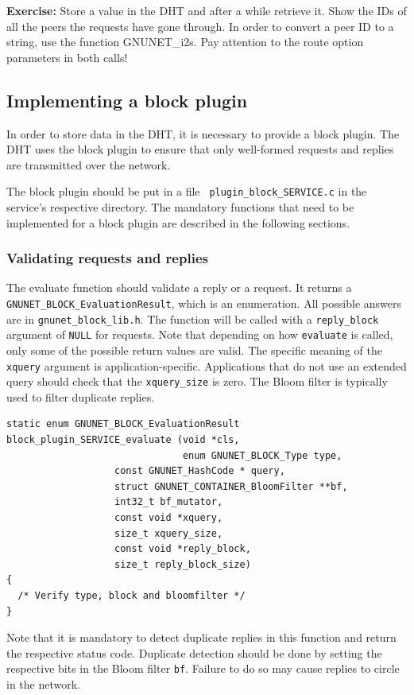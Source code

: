 \documentclass[10pt]{article}
\newcommand{\exercise}[1]{\noindent\begin{boxedminipage}{\textwidth}{\bf Exercise:} #1 \end{boxedminipage}}
\begin{document}
\exercise{Store a value in the DHT and after a while retrieve it. Show the IDs of all 
the peers the requests have gone through. In order to convert a peer ID to a string, use
the function GNUNET\_i2s. Pay attention to the route option parameters in both calls!}

\subsection{Implementing a block plugin}

In order to store data in the DHT, it is necessary to provide a block
plugin.  The DHT uses the block plugin to ensure that only well-formed
requests and replies are transmitted over the network.

The block plugin should be put in a file {\tt
  plugin\_block\_SERVICE.c} in the service's respective directory. The
mandatory functions that need to be implemented for a block plugin are
described in the following sections.

\subsubsection{Validating requests and replies}

The evaluate function should validate a reply or a request. It returns
a {\tt GNUNET\_BLOCK\_EvaluationResult}, which is an enumeration. All
possible answers are in {\tt gnunet\_block\_lib.h}.  The function will
be called with a {\tt reply\_block} argument of {\tt NULL} for
requests.  Note that depending on how {\tt evaluate} is called, only
some of the possible return values are valid.  The specific meaning of
the {\tt xquery} argument is application-specific.  Applications that
do not use an extended query should check that the {\tt xquery\_size}
is zero.  The Bloom filter is typically used to filter duplicate
replies.

\lstset{language=C}
\begin{lstlisting}
static enum GNUNET_BLOCK_EvaluationResult
block_plugin_SERVICE_evaluate (void *cls,
                               enum GNUNET_BLOCK_Type type,
			       const GNUNET_HashCode * query,
			       struct GNUNET_CONTAINER_BloomFilter **bf,
			       int32_t bf_mutator,
			       const void *xquery,
			       size_t xquery_size,
			       const void *reply_block,
			       size_t reply_block_size)
{
  /* Verify type, block and bloomfilter */
}
\end{lstlisting}

Note that it is mandatory to detect duplicate replies in this 
function and return the respective status code.  Duplicate 
detection should be done by setting the respective bits in
the Bloom filter {\tt bf}.  Failure to do so may cause replies
to circle in the network.
\end{document}
